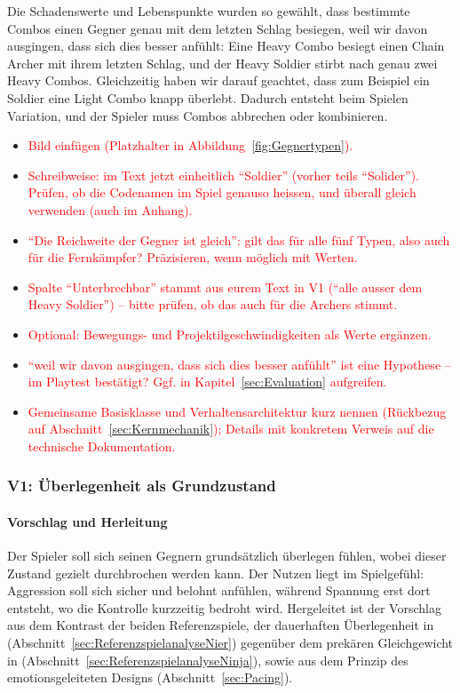 \documentclass[../Main.tex]{subfiles}
\begin{document}
Die Schadenswerte und Lebenspunkte wurden so gewählt, dass bestimmte Combos einen Gegner genau mit dem letzten Schlag besiegen, weil wir davon ausgingen, dass sich dies besser anfühlt: Eine Heavy Combo besiegt einen Chain Archer mit ihrem letzten Schlag, und der Heavy Soldier stirbt nach genau zwei Heavy Combos. Gleichzeitig haben wir darauf geachtet, dass zum Beispiel ein Soldier eine Light Combo knapp überlebt. Dadurch entsteht beim Spielen Variation, und der Spieler muss Combos abbrechen oder kombinieren.

\begin{itemize}[leftmargin=1.5cm]
    \item \textcolor{red}{Bild einfügen (Platzhalter in Abbildung~\ref{fig:Gegnertypen}).}
    \item \textcolor{red}{Schreibweise: im Text jetzt einheitlich \enquote{Soldier} (vorher teils \enquote{Solider}). Prüfen, ob die Codenamen im Spiel genauso heissen, und überall gleich verwenden (auch im Anhang).}
    \item \textcolor{red}{\enquote{Die Reichweite der Gegner ist gleich}: gilt das für alle fünf Typen, also auch für die Fernkämpfer? Präzisieren, wenn möglich mit Werten.}
    \item \textcolor{red}{Spalte \enquote{Unterbrechbar} stammt aus eurem Text in V1 (\enquote{alle ausser dem Heavy Soldier}) -- bitte prüfen, ob das auch für die Archers stimmt.}
    \item \textcolor{red}{Optional: Bewegungs- und Projektilgeschwindigkeiten als Werte ergänzen.}
    \item \textcolor{red}{\enquote{weil wir davon ausgingen, dass sich dies besser anfühlt} ist eine Hypothese -- im Playtest bestätigt? Ggf. in Kapitel~\ref{sec:Evaluation} aufgreifen.}
    \item \textcolor{red}{Gemeinsame Basisklasse und Verhaltensarchitektur kurz nennen (Rückbezug auf Abschnitt~\ref{sec:Kernmechanik}); Details mit konkretem Verweis auf die technische Dokumentation.}
\end{itemize}

\subsubsection{V1: Überlegenheit als Grundzustand} \label{sec:V1}

\paragraph{Vorschlag und Herleitung}
Der Spieler soll sich seinen Gegnern grundsätzlich überlegen fühlen, wobei dieser Zustand gezielt durchbrochen werden kann. Der Nutzen liegt im Spielgefühl: Aggression soll sich sicher und belohnt anfühlen, während Spannung erst dort entsteht, wo die Kontrolle kurzzeitig bedroht wird. Hergeleitet ist der Vorschlag aus dem Kontrast der beiden Referenzspiele, der dauerhaften Überlegenheit in  (Abschnitt~\ref{sec:ReferenzspielanalyseNier}) gegenüber dem prekären Gleichgewicht in  (Abschnitt~\ref{sec:ReferenzspielanalyseNinja}), sowie aus dem Prinzip des emotionsgeleiteten Designs (Abschnitt~\ref{sec:Pacing}).
\end{document}
